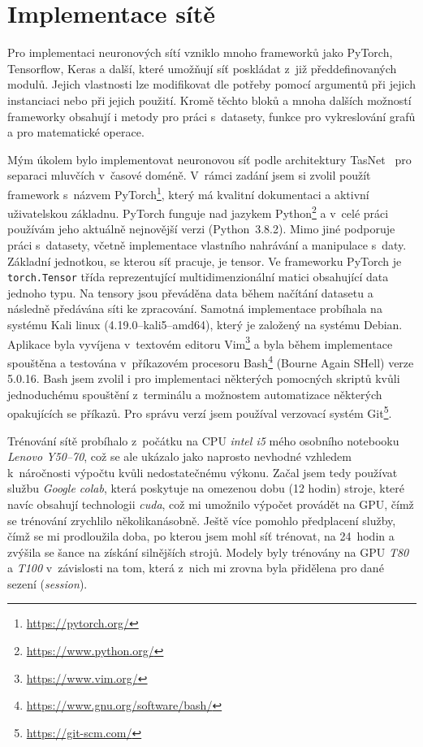 \chapter{Implementace sítě}
\label{implementace}
Pro implementaci neuronových sítí vzniklo mnoho frameworků jako PyTorch, Tensorflow, Keras a další, které umožňují síť poskládat z~již předdefinovaných modulů. Jejich vlastnosti lze modifikovat dle potřeby pomocí argumentů při jejich instanciaci nebo při jejich použití. Kromě těchto bloků a mnoha dalších možností frameworky obsahují i metody pro práci s~datasety, funkce pro vykreslování grafů a pro matematické operace.

Mým úkolem bylo implementovat neuronovou síť podle architektury TasNet~\cite{luo2018convtasnet} pro separaci mluvčích v~časové doméně. V~rámci zadání jsem si zvolil použít framework s~názvem PyTorch\footnote{\url{https://pytorch.org/}}, který má kvalitní dokumentaci a aktivní uživatelskou základnu. PyTorch funguje nad jazykem Python\footnote{\url{https://www.python.org/}} a v~celé práci používám jeho aktuálně nejnovější verzi (Python~3.8.2). Mimo jiné podporuje práci s~datasety, včetně implementace vlastního nahrávání a manipulace s~daty. Základní jednotkou, se kterou síť pracuje, je tensor. Ve frameworku PyTorch je \texttt{torch.Tensor} třída reprezentující multidimenzionální matici obsahující data jednoho typu. Na tensory jsou převáděna data během načítání datasetu a následně předávána síti ke zpracování. Samotná implementace probíhala na systému Kali linux (4.19.0--kali5--amd64), který je založený na systému Debian. Aplikace byla vyvíjena v~textovém editoru Vim\footnote{\url{https://www.vim.org/}} a byla během implementace spouštěna a testována v~příkazovém procesoru Bash\footnote{\url{https://www.gnu.org/software/bash/}} (Bourne Again SHell) verze 5.0.16. Bash jsem zvolil i pro implementaci některých pomocných skriptů kvůli jednoduchému spouštění z~terminálu a možnostem automatizace některých opakujících se příkazů. Pro správu verzí jsem používal verzovací systém Git\footnote{\url{https://git-scm.com/}}.

Trénování sítě probíhalo z~počátku na CPU \textit{intel i5} mého osobního notebooku \textit{Lenovo Y50--70}, což se ale ukázalo jako naprosto nevhodné vzhledem k~náročnosti výpočtu kvůli nedostatečnému výkonu. Začal jsem tedy používat službu \textit{Google colab}, která poskytuje na omezenou dobu (12 hodin) stroje, které navíc obsahují technologii \textit{cuda}, což mi umožnilo výpočet provádět na GPU, čímž se trénování zrychlilo několikanásobně. Ještě více pomohlo předplacení služby, čímž se mi prodloužila doba, po kterou jsem mohl síť trénovat, na 24~hodin a zvýšila se šance na získání silnějších strojů. Modely byly trénovány na GPU \textit{T80} a \textit{T100} v~závislosti na tom, která z~nich mi zrovna byla přidělena pro dané sezení (\textit{session}). 

